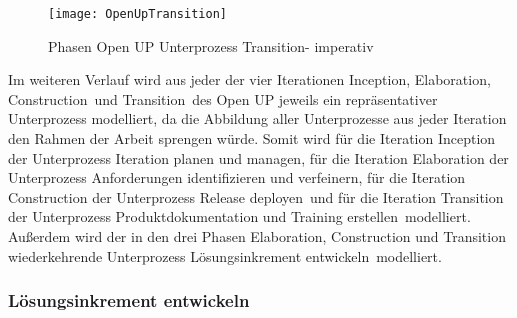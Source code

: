 \begin{figure}[htp]
\begin{center}
  \texttt{[image: OpenUpTransition]} %
  \caption{Phasen Open UP Unterprozess Transition- imperativ}
  \label{fig:OpenUpTransition}
\end{center}
\end{figure}



Im weiteren Verlauf wird aus jeder der vier Iterationen \grqq Inception\grqq, \grqq Elaboration\grqq, \grqq Construction\grqq \  und \grqq Transition\grqq \  des Open UP jeweils ein repräsentativer Unterprozess modelliert, da die Abbildung aller Unterprozesse aus jeder Iteration den Rahmen der Arbeit sprengen würde. \newline
Somit wird für die Iteration Inception der Unterprozess \grqq Iteration planen und managen\grqq, für die Iteration Elaboration der Unterprozess \grqq Anforderungen identifizieren und verfeinern, für die Iteration Construction der Unterprozess \grqq Release deployen\grqq \ und für die Iteration Transition der Unterprozess \grqq Produktdokumentation und Training erstellen\grqq \ modelliert. Außerdem wird der in den drei Phasen Elaboration, Construction und Transition wiederkehrende Unterprozess \grqq Lösungsinkrement entwickeln\grqq \ modelliert.

\subsubsection{Lösungsinkrement entwickeln}

